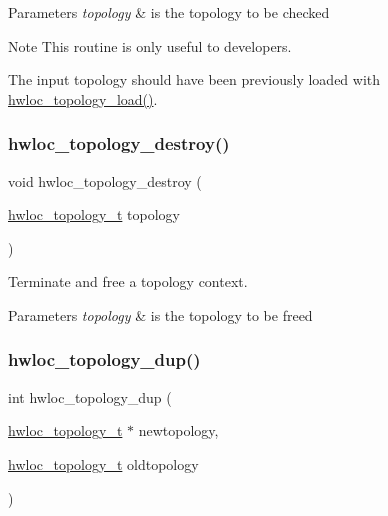 \begin{DoxyParams}{Parameters}
{\em topology} & is the topology to be checked\\
\hline
\end{DoxyParams}
\begin{DoxyNote}{Note}
This routine is only useful to developers.

The input topology should have been previously loaded with \hyperlink{a00186_gabdf58d87ad77f6615fccdfe0535ff826}{hwloc\+\_\+topology\+\_\+load()}. 
\end{DoxyNote}
\mbox{\label{a00186_ga9f34a640b6fd28d23699d4d084667b15}} 
\subsubsection{\texorpdfstring{hwloc\+\_\+topology\+\_\+destroy()}{hwloc\_topology\_destroy()}}
{\footnotesize\ttfamily void hwloc\+\_\+topology\+\_\+destroy (\begin{DoxyParamCaption}\item[{\hyperlink{a00186_ga9d1e76ee15a7dee158b786c30b6a6e38}{hwloc\+\_\+topology\+\_\+t}}]{topology }\end{DoxyParamCaption})}



Terminate and free a topology context. 


\begin{DoxyParams}{Parameters}
{\em topology} & is the topology to be freed \\
\hline
\end{DoxyParams}
\mbox{\label{a00186_ga62a161fc5e6f120344dc69a7bee4e587}} 
\subsubsection{\texorpdfstring{hwloc\+\_\+topology\+\_\+dup()}{hwloc\_topology\_dup()}}
{\footnotesize\ttfamily int hwloc\+\_\+topology\+\_\+dup (\begin{DoxyParamCaption}\item[{\hyperlink{a00186_ga9d1e76ee15a7dee158b786c30b6a6e38}{hwloc\+\_\+topology\+\_\+t} $\ast$}]{newtopology,  }\item[{\hyperlink{a00186_ga9d1e76ee15a7dee158b786c30b6a6e38}{hwloc\+\_\+topology\+\_\+t}}]{oldtopology }\end{DoxyParamCaption})}



